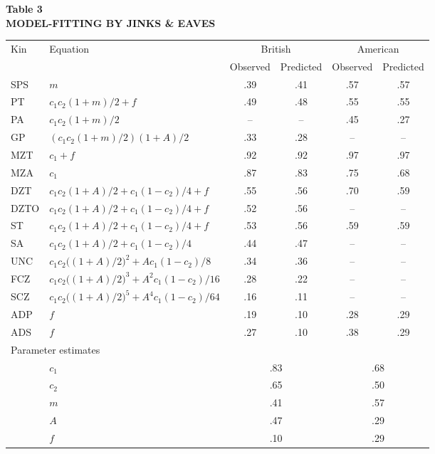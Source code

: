 ﻿\documentclass[12pt]{article}
\begin{document}
\begin{center}
\textbf{Table 3}\\
\textbf{MODEL-FITTING BY JINKS \& EAVES}
\end{center}
\begin{center}
\small
\begin{tabular}{l l c c c c}
\hline
Kin & Equation & \multicolumn{2}{c}{British} & \multicolumn{2}{c}{American} \\
 & & Observed & Predicted & Observed & Predicted \\
\hline
SPS & $m$ & .39 & .41 & .57 & .57 \\
PT & $c_1c_2(1+m)/2 + f$ & .49 & .48 & .55 & .55 \\
PA & $c_1c_2(1+m)/2$ & -- & -- & .45 & .27 \\
GP & $(c_1c_2(1+m)/2)(1+A)/2$ & .33 & .28 & -- & -- \\
MZT & $c_1 + f$ & .92 & .92 & .97 & .97 \\
MZA & $c_1$ & .87 & .83 & .75 & .68 \\
DZT & $c_1c_2(1+A)/2 + c_1(1-c_2)/4 + f$ & .55 & .56 & .70 & .59 \\
DZTO & $c_1c_2(1+A)/2 + c_1(1-c_2)/4 + f$ & .52 & .56 & -- & -- \\
ST & $c_1c_2(1+A)/2 + c_1(1-c_2)/4 + f$ & .53 & .56 & .59 & .59 \\
SA & $c_1c_2(1+A)/2 + c_1(1-c_2)/4$ & .44 & .47 & -- & -- \\
UNC & $c_1c_2\big((1+A)/2\big)^2 + A c_1(1-c_2)/8$ & .34 & .36 & -- & -- \\
FCZ & $c_1c_2\big((1+A)/2\big)^3 + A^2 c_1(1-c_2)/16$ & .28 & .22 & -- & -- \\
SCZ & $c_1c_2\big((1+A)/2\big)^5 + A^4 c_1(1-c_2)/64$ & .16 & .11 & -- & -- \\
ADP & $f$ & .19 & .10 & .28 & .29 \\
ADS & $f$ & .27 & .10 & .38 & .29 \\
\hline
\multicolumn{6}{l}{Parameter estimates} \\
\hline
& $c_1$ & \multicolumn{2}{c}{.83} & \multicolumn{2}{c}{.68} \\
& $c_2$ & \multicolumn{2}{c}{.65} & \multicolumn{2}{c}{.50} \\
& $m$ & \multicolumn{2}{c}{.41} & \multicolumn{2}{c}{.57} \\
& $A$ & \multicolumn{2}{c}{.47} & \multicolumn{2}{c}{.29} \\
& $f$ & \multicolumn{2}{c}{.10} & \multicolumn{2}{c}{.29} \\
\hline
\end{tabular}
\end{center}
\end{document}
